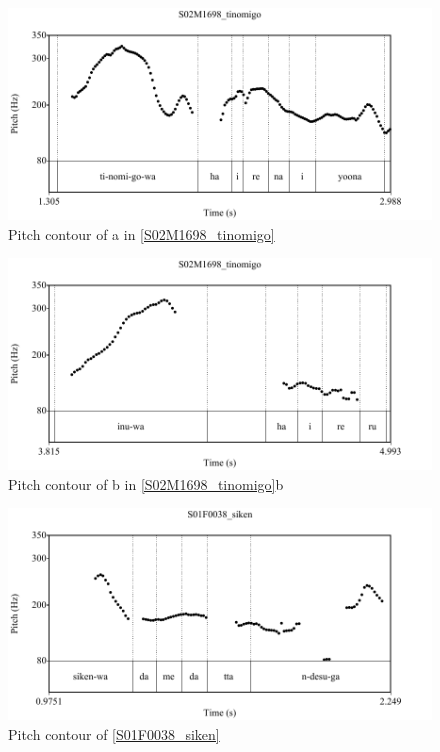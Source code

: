 \begin{figure}
	\begin{center}
	\includegraphics[width=.6\textwidth]{sounds/S02M1698_tinomigo.pdf}
	\caption{Pitch contour of a in \ref{S02M1698_tinomigo}}
	\label{S02M1698_tinomigoF}
	\end{center}
\end{figure}
\begin{figure}
	\begin{center}
	\includegraphics[width=.6\textwidth]{sounds/S02M1698_inu.pdf}
	\caption{Pitch contour of b in \ref{S02M1698_tinomigo}b}
	\label{S02M1698_inuF}
	\end{center}
\end{figure}
\begin{figure}
	\begin{center}
	\includegraphics[width=.6\textwidth]{sounds/S01F0038_siken.pdf}
	\caption{Pitch contour of \ref{S01F0038_siken}}
	\label{S01F0038_sikenF}
	\end{center}
\end{figure}

